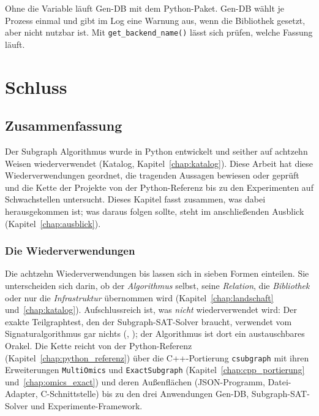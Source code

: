 Ohne die Variable läuft Gen-DB mit dem Python-Paket. Gen-DB wählt je Prozess einmal und gibt im Log eine Warnung aus, wenn die Bibliothek gesetzt, aber nicht nutzbar ist. Mit \texttt{get\_backend\_name()} lässt sich prüfen, welche Fassung läuft.

\part{Schluss}

\chapter{Zusammenfassung}
\label{chap:zusammenfassung}

Der Subgraph Algorithmus wurde in Python entwickelt und seither auf achtzehn Weisen wiederverwendet (Katalog, Kapitel~\ref{chap:katalog}). Diese Arbeit hat diese Wiederverwendungen geordnet, die tragenden Aussagen bewiesen oder geprüft und die Kette der Projekte von der Python-Referenz bis zu den Experimenten auf Schwachstellen untersucht. Dieses Kapitel fasst zusammen, was dabei herausgekommen ist; was daraus folgen sollte, steht im anschließenden Ausblick (Kapitel~\ref{chap:ausblick}).

\section{Die Wiederverwendungen}

Die achtzehn Wiederverwendungen  bis  lassen sich in sieben Formen einteilen. Sie unterscheiden sich darin, ob der \emph{Algorithmus} selbst, seine \emph{Relation}, die \emph{Bibliothek} oder nur die \emph{Infrastruktur} übernommen wird (Kapitel~\ref{chap:landschaft} und~\ref{chap:katalog}). Aufschlussreich ist, was \emph{nicht} wiederverwendet wird: Der exakte Teilgraphtest, den der Subgraph-SAT-Solver braucht, verwendet vom Signaturalgorithmus gar nichts (, ); der Algorithmus ist dort ein austauschbares Orakel. Die Kette reicht von der Python-Referenz (Kapitel~\ref{chap:python_referenz}) über die C++-Portierung \texttt{csubgraph} mit ihren Erweiterungen \texttt{MultiOmics} und \texttt{ExactSubgraph} (Kapitel~\ref{chap:cpp_portierung} und~\ref{chap:omics_exact}) und deren Außenflächen (JSON-Programm, Datei-Adapter, C-Schnittstelle) bis zu den drei Anwendungen Gen-DB, Subgraph-SAT-Solver und Experimente-Framework.

